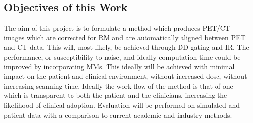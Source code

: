         \subsection{Objectives of this Work} \label{objectives_of_this_work}
            The aim of this project is to formulate a method which produces \gls{PET}/\gls{CT} images which are corrected for \gls{RM} and are automatically aligned between \gls{PET} and \gls{CT} data. This will, most likely, be achieved through \gls{DD} gating and \gls{IR}. The performance, or susceptibility to noise, and ideally computation time could be improved by incorporating \gls{MM}s. This ideally will be achieved with minimal impact on the patient and clinical environment, without increased dose, without increasing scanning time. Ideally the work flow of the method is that of one which is transparent to both the patient and the clinicians, increasing the likelihood of clinical adoption. Evaluation will be performed on simulated and patient data with a comparison to current academic and industry methods.
    
        \blindtext

